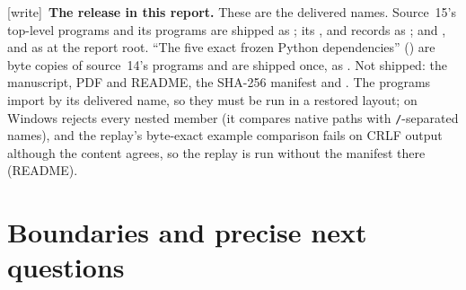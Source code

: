 \documentclass[11pt,letterpaper]{article}
\numberwithin{equation}{section}
\theoremstyle{definition}
\theoremstyle{remark}
\newcommand{\wtag}{\textup{[write]}}
\begin{document}
\wtag\ \textbf{The release in this report.} These are the delivered names. Source~15's top-level programs and its  programs are shipped as ; its ,  and  records as ; and ,  and  as  at the report root. ``The five exact frozen Python dependencies'' () are byte copies of source~14's programs and are shipped once, as . Not shipped: the manuscript, PDF and README, the SHA-256 manifest and . The programs import  by its delivered name, so they must be run in a restored layout; on Windows  rejects every nested member (it compares native paths with \texttt{/}-separated names), and the replay's byte-exact example comparison fails on CRLF output although the content agrees, so the replay is run without the manifest there (README).

\section{Boundaries and precise next questions}\label{smc:ct:sec:questions}
\end{document}
